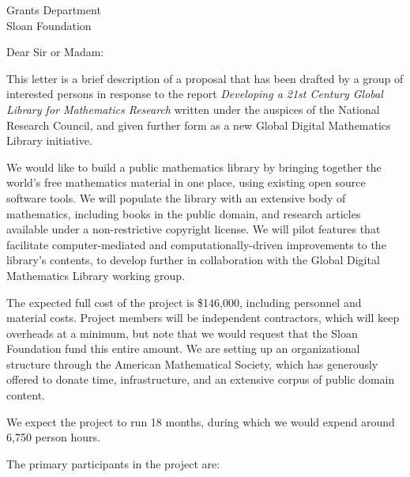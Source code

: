 \documentclass{letter}
\begin{document}
\signature{Volker Sorge}
\address{Volker Sorge\\
School of Computer Science\\
University of Birmingham\\
B15 2TT, UK}
\begin{letter}{Grants Department \\ Sloan Foundation}
\opening{Dear Sir or Madam:}


This letter is a brief description of a proposal that has been drafted
by a group of interested persons in response to the report
\emph{Developing a 21st Century Global Library for Mathematics
  Research} written under the auspices of the National Research
Council, and given further form as a new Global Digital Mathematics
Library initiative.

We would like to build a public mathematics library by bringing
together the world's free mathematics material in one place, using
existing open source software tools.
%
We will populate the library with an extensive body of mathematics,
including books in the public domain, and research articles available
under a non-restrictive copyright license.
%
We will pilot features that facilitate computer-mediated and
computationally-driven improvements to the library's contents, to
develop further in collaboration with the Global Digital Mathematics
Library working group.

The expected full cost of the project is \$146,000, including
personnel and material costs.  Project members will be independent
contractors, which will keep overheads at a minimum, but note that we
would request that the Sloan Foundation fund this entire amount.  We
are setting up an organizational structure through the American
Mathematical Society, which has generously offered to donate time,
infrastructure, and an extensive corpus of public domain content.

We expect the project to run 18 months, during which we would expend
around 6,750 person hours.

The primary participants in the project are:


\end{letter}
\end{document}
